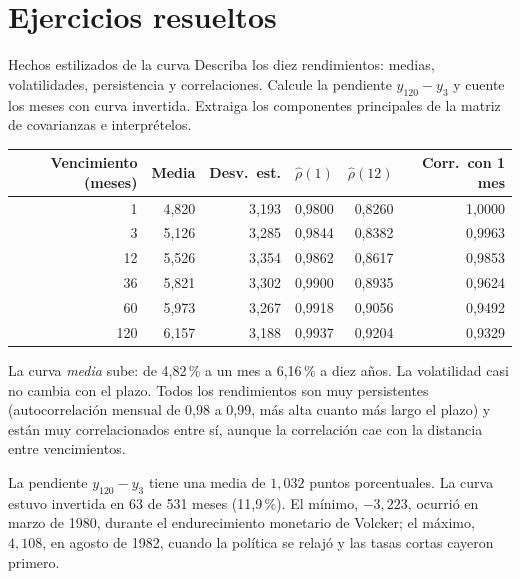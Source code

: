 \section{Ejercicios resueltos}

\begin{ejresuelto}{Hechos estilizados de la curva}\label{ej:curva}
\enunciado Describa los diez rendimientos: medias, volatilidades, persistencia y correlaciones. Calcule la pendiente
$y_{120}-y_3$ y cuente los meses con curva invertida. Extraiga los componentes principales de la matriz de covarianzas e
interprételos.

\solucion
{}
\begin{center}\small
\begin{tabular}{@{}rrrrrr@{}}
\toprule
Vencimiento (meses) & Media & Desv.\ est. & $\hat\rho(1)$ & $\hat\rho(12)$ & Corr.\ con 1 mes \\
\midrule
1   & 4,820 & 3,193 & 0,9800 & 0,8260 & 1,0000 \\
3   & 5,126 & 3,285 & 0,9844 & 0,8382 & 0,9963 \\
12  & 5,526 & 3,354 & 0,9862 & 0,8617 & 0,9853 \\
36  & 5,821 & 3,302 & 0,9900 & 0,8935 & 0,9624 \\
60  & 5,973 & 3,267 & 0,9918 & 0,9056 & 0,9492 \\
120 & 6,157 & 3,188 & 0,9937 & 0,9204 & 0,9329 \\
\bottomrule
\end{tabular}
\end{center}
La curva \emph{media} sube: de 4,82\,\% a un mes a 6,16\,\% a diez años. La volatilidad casi no cambia con el plazo. Todos
los rendimientos son muy persistentes (autocorrelación mensual de 0,98 a 0,99, más alta cuanto más largo el plazo) y están
muy correlacionados entre sí, aunque la correlación cae con la distancia entre vencimientos.

 La pendiente $y_{120}-y_3$ tiene una media de $1{,}032$ puntos porcentuales. La curva estuvo
invertida en 63 de 531 meses (11,9\,\%). El mínimo, $-3{,}223$, ocurrió en marzo de 1980, durante el endurecimiento monetario
de Volcker; el máximo, $4{,}108$, en agosto de 1982, cuando la política se relajó y las tasas cortas cayeron primero.


\end{ejresuelto}

